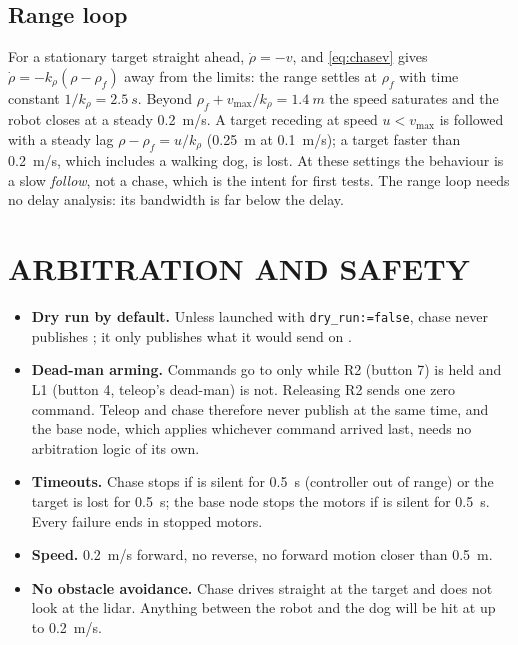 \subsection{Range loop}

For a stationary target straight ahead, $\dot\rho=-v$, and
\eqref{eq:chasev} gives $\dot\rho=-k_\rho(\rho-\rho_f)$ away from the limits:
the range settles at $\rho_f$ with time constant $1/k_\rho=\SI{2.5}{s}$.
Beyond $\rho_f+v_{\max}/k_\rho=\SI{1.4}{m}$ the speed saturates and the robot
closes at a steady \SI{0.2}{m/s}. A target receding at speed $u<v_{\max}$ is
followed with a steady lag $\rho-\rho_f=u/k_\rho$ (\SI{0.25}{m} at
\SI{0.1}{m/s}); a target faster than \SI{0.2}{m/s}, which includes a walking
dog, is lost. At these settings the behaviour is a slow \emph{follow}, not a
chase, which is the intent for first tests. The range loop needs no delay
analysis: its bandwidth is far below the delay.

\section{ARBITRATION AND SAFETY}
\label{sec:chasesafety}

\begin{itemize}
\item \textbf{Dry run by default.} Unless launched with
  \texttt{dry\_run:=false}, chase never publishes ; it only
  publishes what it would send on .
\item \textbf{Dead-man arming.} Commands go to  only while
  R2 (button 7) is held and L1 (button 4, teleop's dead-man) is not. Releasing
  R2 sends one zero command. Teleop and chase therefore never publish at the
  same time, and the base node, which applies whichever command arrived last,
  needs no arbitration logic of its own.
\item \textbf{Timeouts.} Chase stops if  is silent for
  \SI{0.5}{s} (controller out of range) or the target is lost for
  \SI{0.5}{s}; the base node stops the motors if  is silent
  for \SI{0.5}{s}. Every failure ends in stopped motors.
\item \textbf{Speed.} \SI{0.2}{m/s} forward, no reverse, no forward motion
  closer than \SI{0.5}{m}.
\item \textbf{No obstacle avoidance.} Chase drives straight at the target and
  does not look at the lidar. Anything between the robot and the dog will be
  hit at up to \SI{0.2}{m/s}.
\end{itemize}

